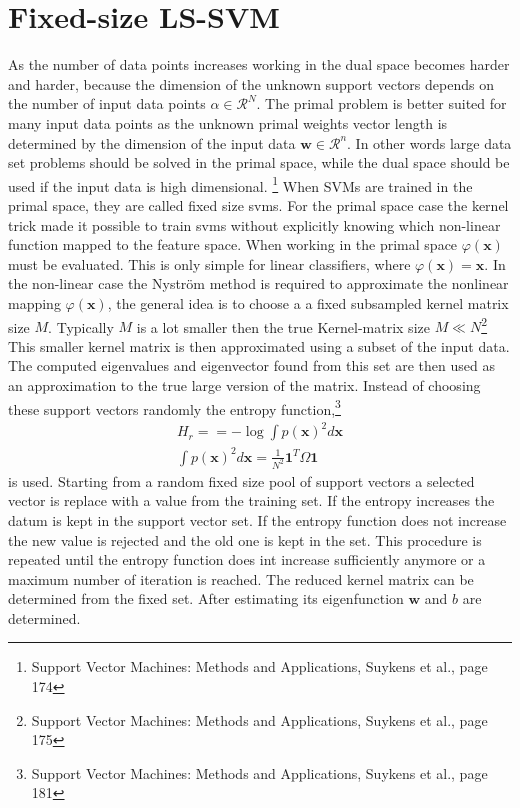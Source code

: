 \section{Fixed-size LS-SVM}
As the number of data points increases working in the dual space becomes harder and harder, because the dimension of the unknown support vectors depends on the number of input data points $\alpha \in \mathcal{R}^N$. The primal problem is better suited for many input data points as the unknown primal weights vector length is determined by the dimension of the input data $\mathbf{w} \in \mathcal{R}^n$. In other words large data set problems should be solved in the primal space, while the dual space should be used if the input data is high dimensional. \footnote{Support Vector Machines: Methods and Applications, Suykens et al., page 174}
When SVMs are trained in the primal space, they are called fixed size svms. For the primal space case the kernel trick made it possible to train svms without explicitly knowing which non-linear function mapped to the feature space. When working in the primal space $\varphi(\mathbf{x})$ must be evaluated. This is only simple for linear classifiers, where $\varphi(\mathbf{x}) = \mathbf{x}$. In the non-linear case the Nystr\"{o}m method is required to approximate the nonlinear mapping $\varphi(\mathbf{x})$, the general idea is to choose a a fixed subsampled kernel matrix size $M$. Typically $M$ is a lot smaller then the true Kernel-matrix size $M \ll N$\footnote{Support Vector Machines: Methods and Applications, Suykens et al., page 175}  
This smaller kernel matrix is then approximated using a subset of the input data. The computed eigenvalues and eigenvector found from this set are then used as an approximation to the true large version of the matrix. 
Instead of choosing these support vectors randomly the entropy function,\footnote{Support Vector Machines: Methods and Applications, Suykens et al., page 181} 
\begin{align}
H_r = = - \log\int p(\mathbf{x})^2 d\mathbf{x} \\
\int p(\mathbf{x})^2 d\mathbf{x} = \frac{1}{N^2} \mathbf{1}^T \Omega \mathbf{1}
\end{align}
is used. Starting from a random fixed size pool of support vectors a selected vector is replace with a value from the training set. If the entropy increases the datum is kept in the support vector set. If the entropy function does not increase the new value is rejected and the old one is kept in the set. This procedure is repeated until the entropy function does int increase sufficiently anymore or a maximum number of iteration is reached. The reduced kernel matrix can be determined from the fixed set. After estimating its eigenfunction $\mathbf{w}$ and $b$ are determined.
